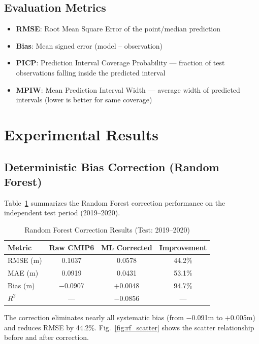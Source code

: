 \documentclass[conference]{IEEEtran}
\begin{document}
\subsection{Evaluation Metrics}

\begin{itemize}
    \item \textbf{RMSE}: Root Mean Square Error of the point/median prediction
    \item \textbf{Bias}: Mean signed error (model -- observation)
    \item \textbf{PICP}: Prediction Interval Coverage Probability --- fraction of test observations falling inside the predicted interval
    \item \textbf{MPIW}: Mean Prediction Interval Width --- average width of predicted intervals (lower is better for same coverage)
\end{itemize}

\section{Experimental Results}

\subsection{Deterministic Bias Correction (Random Forest)}

Table~\ref{tab:rf_results} summarizes the Random Forest correction performance on the independent test period (2019--2020).

\begin{table}[H]
\centering
\caption{Random Forest Correction Results (Test: 2019--2020)}
\label{tab:rf_results}
\begin{tabular}{@{}lccc@{}}
\toprule
\textbf{Metric} & \textbf{Raw CMIP6} & \textbf{ML Corrected} & \textbf{Improvement} \\
\midrule
RMSE (m) & 0.1037 & 0.0578 & 44.2\% \\
MAE (m) & 0.0919 & 0.0431 & 53.1\% \\
Bias (m) & $-$0.0907 & $+$0.0048 & 94.7\% \\
$R^2$ & --- & $-$0.0856 & --- \\
\bottomrule
\end{tabular}
\end{table}

The correction eliminates nearly all systematic bias (from $-$0.091m to $+$0.005m) and reduces RMSE by 44.2\%. Fig.~\ref{fig:rf_scatter} shows the scatter relationship before and after correction.
\end{document}
